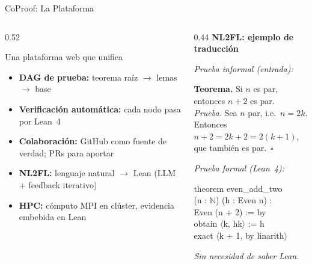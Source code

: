 \documentclass[aspectratio=169, 10pt]{beamer}
\begin{document}
\begin{frame}{CoProof: La Plataforma}
  \begin{columns}[T]
    \begin{column}{0.52\textwidth}
      \begin{block}{Una plataforma web que unifica}
        \begin{itemize}
          \item \textbf{DAG de prueba:} teorema ra\'{i}z $\to$ lemas $\to$ base
          \item \textbf{Verificaci\'{o}n autom\'{a}tica:} cada nodo pasa por Lean~4
          \item \textbf{Colaboraci\'{o}n:} GitHub como fuente de verdad; PRs para aportar
          \item \textbf{NL2FL:} lenguaje natural $\to$ Lean (LLM + feedback iterativo)
          \item \textbf{HPC:} c\'{o}mputo MPI en cl\'{u}ster, evidencia embebida en Lean
        \end{itemize}
      \end{block}
    \end{column}
    \begin{column}{0.44\textwidth}
      \textbf{NL2FL: ejemplo de traducci\'{o}n}
      \vspace{0.25cm}

      {\footnotesize\color{cpGray}\textit{Prueba informal (entrada):}}\\
      \colorbox{darkframe}{\parbox{\linewidth}{%
        \footnotesize\raggedright
        \textbf{Teorema.} Si $n$ es par, entonces $n+2$ es par.\\[3pt]
        \textit{Prueba.} Sea $n$ par, i.e.\ $n = 2k$.\\
        Entonces $n+2 = 2k+2 = 2(k{+}1)$,\\
        que tambi\'{e}n es par.~$\square$
      }}
      \vspace{0.3cm}

      {\footnotesize\color{leanpurple}\textit{Prueba formal (Lean~4):}}\\
      \colorbox{darkframe}{\parbox{\linewidth}{%
        \ttfamily\scriptsize\color{leanpurple}
        theorem even\_add\_two\\[1pt]
        \hspace*{0.4em}(n : $\mathbb{N}$) (h : Even n) :\\[1pt]
        \hspace*{0.4em}Even (n + 2) := by\\[1pt]
        \hspace*{0.4em}obtain $\langle$k, hk$\rangle$ := h\\[1pt]
        \hspace*{0.4em}exact $\langle$k + 1, by linarith$\rangle$
      }}
      \vspace{0.3cm}

      {\small\color{cpGray}\textit{Sin necesidad de saber Lean.}}
    \end{column}
  \end{columns}
\end{frame}
\end{document}
